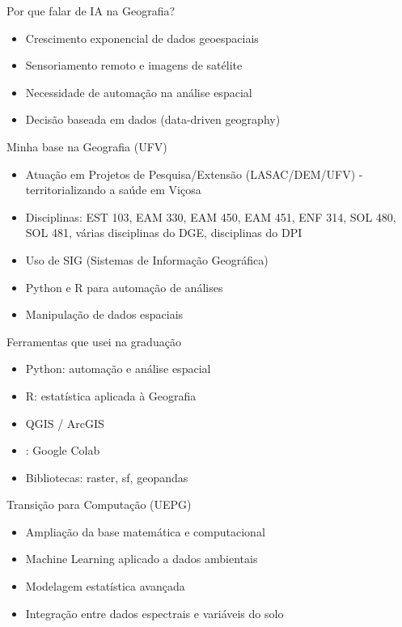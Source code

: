 \documentclass{beamer}
\begin{document}
\begin{frame}{Por que falar de IA na Geografia?}
\begin{itemize}
    \item Crescimento exponencial de dados geoespaciais
    \item Sensoriamento remoto e imagens de satélite
    \item Necessidade de automação na análise espacial
    \item Decisão baseada em dados (data-driven geography)
\end{itemize}
\end{frame}

\begin{frame}{Minha base na Geografia (UFV)}
\begin{itemize}
    \item Atuação em Projetos de Pesquisa/Extensão (LASAC/DEM/UFV) - territorializando a saúde em Viçosa
    \item Disciplinas: EST 103, EAM 330, EAM 450, EAM 451, ENF 314, SOL 480, SOL 481, várias disciplinas do DGE, disciplinas do DPI 
    \item Uso de SIG (Sistemas de Informação Geográfica)
    \item Python e R para automação de análises
    \item Manipulação de dados espaciais
\end{itemize}
\end{frame}

\begin{frame}{Ferramentas que usei na graduação}
\begin{itemize}
    \item Python: automação e análise espacial
    \item R: estatística aplicada à Geografia
    \item QGIS / ArcGIS
    \item: Google Colab
    \item Bibliotecas: raster, sf, geopandas
\end{itemize}
\end{frame}

\begin{frame}{Transição para Computação (UEPG)}
\begin{itemize}
    \item Ampliação da base matemática e computacional
    \item Machine Learning aplicado a dados ambientais
    \item Modelagem estatística avançada
    \item Integração entre dados espectrais e variáveis do solo
\end{itemize}
\end{frame}
\end{document}
